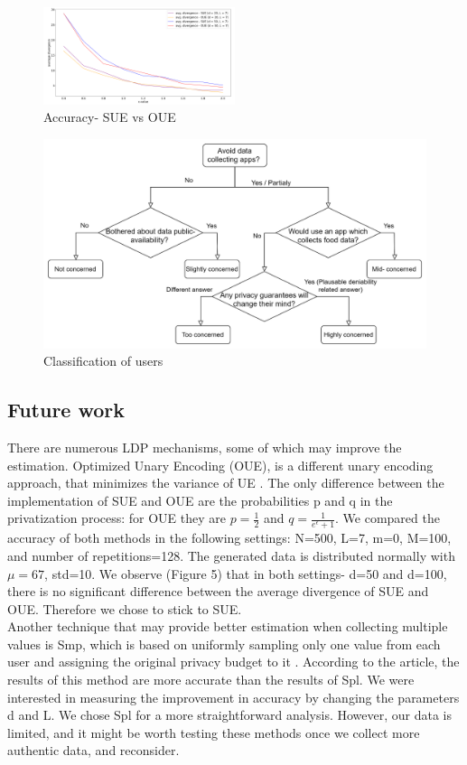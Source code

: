 \documentclass[sigconf]{acmart}
\begin{document}
\begin{figure}[h]
    \centering
    \includegraphics[width=0.5\textwidth]{images/SUE OUE.png}
    \caption{Accuracy- SUE vs OUE}
    \label{fig:enter-label}
\end{figure}
\begin{figure}[ht]
    \begin{center}
        \includegraphics[width=\textwidth]{images/classification.png}
        \caption{Classification of users}
        \label{fig:accuracy-d}
    \end{center}
\end{figure} 
\subsection{Future work} There are numerous LDP mechanisms, some of which may improve the estimation. Optimized Unary Encoding (OUE), is a different unary encoding approach, that minimizes the variance of UE \cite{3_wang2020comprehensive}. The only difference between the implementation of SUE and OUE are the probabilities p and q in the privatization process: for OUE they are $p=\frac{1}{2}$ and $q=\frac{1}{e^{\epsilon}+1}$. We compared the accuracy of both methods in the following settings: N=500, L=7, m=0, M=100, and number of repetitions=128. The generated data is distributed normally with $\mu=67$, std=10. We observe (Figure 5) that in both settings- d=50 and d=100, there is no significant difference between the average divergence of SUE and OUE. Therefore we chose to stick to SUE.\\
Another technique that may provide better estimation when collecting multiple values is Smp, which is based on uniformly sampling only one value from each user and assigning the original privacy budget to it \cite{4_arcolezi2022improving}. According to the article, the results of this method are more accurate than the results of Spl. We were interested in measuring the improvement in accuracy by changing the parameters d and L. We chose Spl for a more straightforward analysis. However, our data is limited, and it might be worth testing these methods once we collect more authentic data, and reconsider.
\end{document}
